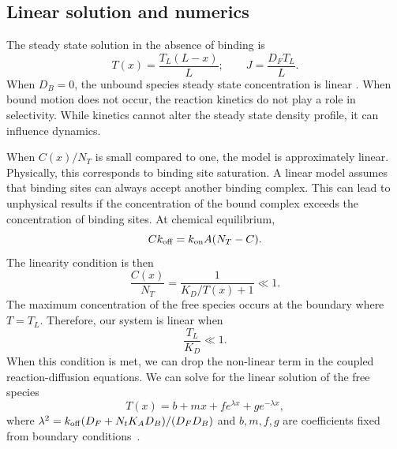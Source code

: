 \subsection{Linear solution and numerics}\label{sec:numerics_and_properties}

The steady state solution in the absence of binding is
%
\begin{equation}
\label{eqn:linear_steady}
  T(x) = \frac{T_L (L-x)}{L}; \qquad J = \frac{D_F T_L}{L}.
\end{equation}
%
When $D_B=0$, the unbound species steady state concentration is linear
.  When bound motion does not occur, the reaction
kinetics do not play a role in selectivity.  While kinetics cannot alter the
steady state density profile, it can influence dynamics.

When $C(x)/N_T$ is small compared to one, the model is approximately linear.
Physically, this corresponds to binding site saturation.  A linear model assumes
that binding sites can always accept another binding complex.  This can lead to
unphysical results if the concentration of the bound complex exceeds the
concentration of binding sites.  At chemical equilibrium,
%
\begin{equation}
  C k_{\rm off}  =  k_{\rm on} A (N_T - C ).
\end{equation}
%
The linearity condition is then
%
\begin{equation}
  \frac{C(x)}{N_T} = \frac{1}{K_D / T(x) + 1} \ll 1.
\end{equation}
% 
The maximum concentration of the free species occurs at the boundary where
$T=T_L$.  Therefore, our system is linear when
%
\begin{equation}
  \label{eqn:rd_linear_cond}
  \frac{T_L}{K_D} \ll 1.
\end{equation}
%
When this condition is met, we can drop the non-linear term in the coupled
reaction-diffusion equations. We can solve for the linear solution of the free
species
%
\begin{equation}
  \label{eqn:rd_linear_sol}
  T(x) = b + m x + f e^{\lambda x} + g e^{-\lambda x},
\end{equation}
%
where $\lambda^2 = k_{\rm off}(D_F+ N_t K_A D_B)/(D_F D_B)$ and $b, m, f, g$ are
coefficients fixed from boundary conditions~\cite{maguire_design_18}.

